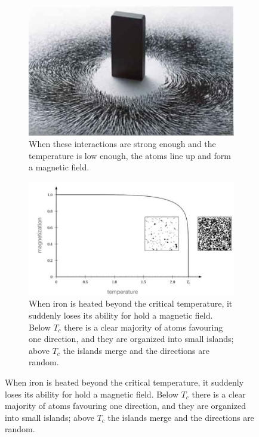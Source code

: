 \documentclass[]{article}
\begin{document}
\begin{figure}[H]
	\begin{center}
		\caption[Ising Model: Atoms in a block of iron interact with their neighbours]{Ising Model: Atoms in a block of iron interact with their neighbours $\uparrow\uparrow\uparrow\downarrow\downarrow\uparrow\uparrow\downarrow\uparrow\uparrow\uparrow\uparrow$.}
		\begin{subfigure}[t]{0.3\textwidth}
			\caption{When these interactions are strong enough and the temperature is low enough, the atoms line up and form a magnetic field.}
			\includegraphics[width=\textwidth]{permanent-magnet}
		\end{subfigure}
		\;\;\;
		\begin{subfigure}[t]{0.6\textwidth}
			\caption{When iron is heated beyond the critical temperature, it suddenly loses its ability for hold a magnetic field. Below $T_c$ there is a clear majority of atoms favouring one direction, and they are organized into small islands; above $T_c$ the islands merge and the directions are random.}
			\includegraphics[width=\textwidth]{curie-temperature}
		\end{subfigure}
	\end{center}
\end{figure}
\end{document}

